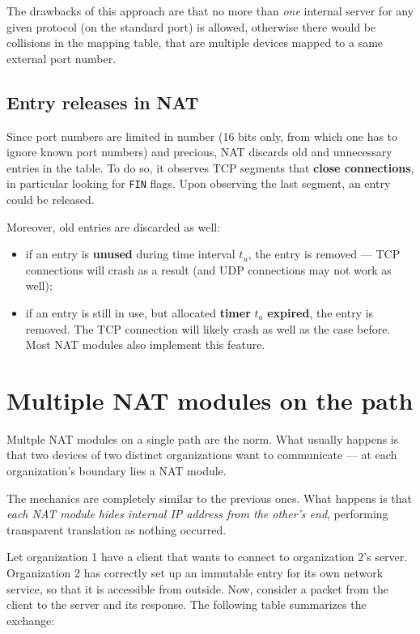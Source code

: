 \documentclass[10pt]{\classname}
\begin{document}
The drawbacks of this approach are that no more than \emph{one} internal server
for any given protocol (on the standard port) is allowed, otherwise there would
be collisions in the mapping table, that are multiple devices mapped to a same
external port number.

\subsection{Entry releases in NAT}

Since port numbers are limited in number (16 bits only, from which one has to
ignore known port numbers) and precious, NAT discards old and unnecessary
entries in the table. To do so, it observes TCP segments that \textbf{close
connections}, in particular looking for \texttt{FIN} flags. Upon observing the last segment, an entry could be released. 

Moreover, old entries are discarded as well:
\begin{itemize}
    \item if an entry is \textbf{unused} during time interval $t_{u}$, the
        entry is removed --- TCP connections will crash as a result (and UDP
        connections may not work as well);
    \item if an entry is still in use, but allocated \textbf{timer} $t_{a}$
        \textbf{expired}, the entry is removed. The TCP connection will likely
        crash as well as the case before. Most NAT modules also implement this
        feature.
\end{itemize}

\section{Multiple NAT modules on the path}

Multple NAT modules on a single path are the norm. What usually happens is that two devices of two distinct organizations want to communicate --- at each organization's boundary lies a NAT module. 

The mechanics are completely similar to the previous ones. What happens is that
\emph{each NAT module hides internal IP address from the other's end},
performing transparent translation as nothing occurred.

Let organization 1 have a client that wants to connect to organization 2's
server. Organization 2 has correctly set up an immutable entry for its own network
service, so that it is accessible from outside. Now, consider a packet from the
client to the server and its response. The following table summarizes the
exchange:
\end{document}
